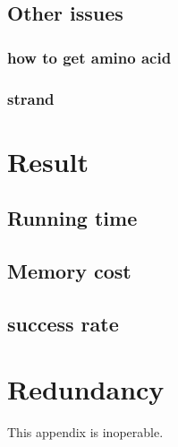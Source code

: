 \documentclass[onehalf,11pt]{beavtex}
\begin{document}
\section{Other issues}
\subsection{how to get amino acid}

\subsection{strand}

\chapter{Result}

\section{Running time}

\section{Memory cost}

\section{success rate}



\appendix
\chapter{Redundancy}
This appendix is inoperable.
\end{document}
